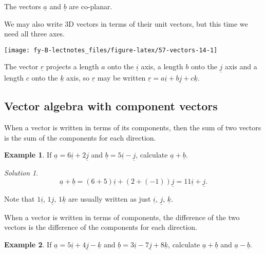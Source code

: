 \documentclass[
  english,
  11pt,
  oneside]{book}
\newcommand{\slide}{}
\theoremstyle{definition}
\theoremstyle{definition}
\newtheorem{example}{Example}[chapter]
\theoremstyle{definition}
\theoremstyle{definition}
\theoremstyle{remark}
\newtheorem*{solution}{Solution}
\begin{document}
The vectors \(\underline a\) and \(\underline b\) are co-planar.

\slide

We may also write 3D vectors in terms of their unit vectors, but this time we need all three axes.

\begin{center}\texttt{[image: fy-B-lectnotes\_files/figure-latex/57-vectors-14-1]} \end{center}

The vector \(\underline r\) projects a length \(a\) onto the \(\underline i\) axis, a length \(b\) onto the \(\underline j\) axis and a length \(c\) onto the \(\underline k\) axis, so \(\underline r\) may be written \(\underline r = a\underline i + b\underline j + c\underline k\).

\slide

\subsection{Vector algebra with component vectors}\label{vector-algebra-with-component-vectors}

When a vector is written in terms of its components, then the sum of two vectors is the sum of the components for each direction.

\begin{example}
If \(\underline a = 6\underline i + 2\underline j\) and \(\underline b = 5\underline i - \underline j\), calculate \(\underline{a}+\underline{b}\).
\end{example}

\begin{solution}
\[
\underline a + \underline b = (6 + 5)\underline i + (2 + (-1))\underline j = 11\underline i + \underline j.
\]
\end{solution}

Note that \(1\underline i\), \(1\underline j\), \(1\underline k\) are usually written as just \(\underline i\), \(\underline j\), \(\underline k\).

\slide

When a vector is written in terms of components, the difference of the two vectors is the difference of the components for each direction.

\begin{example}
If \(\underline a = 5\underline i + 4\underline j - \underline k\) and \(\underline b = 3\underline i - 7\underline j + 8\underline k\), calculate \(\underline{a}+\underline{b}\) and \(\underline{a}-\underline{b}\).
\end{example}
\end{document}

